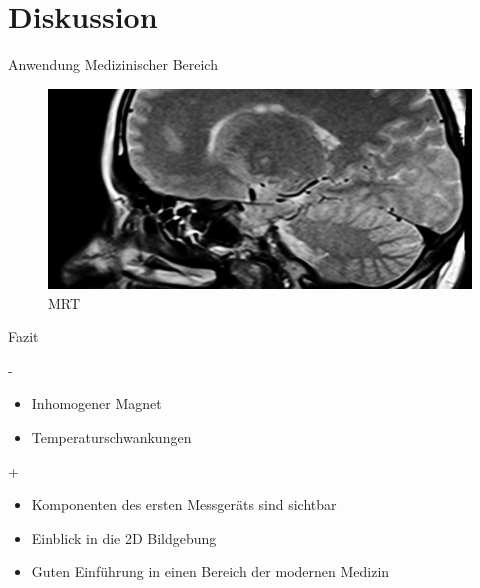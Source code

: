 \section{Diskussion}
\begin{frame}{Anwendung}
Medizinischer Bereich
	\begin{figure}
	\centering
	\includegraphics[scale=.35]{images//mrt.jpg}
	\caption{MRT}
	\end{figure}
\end{frame}

\begin{frame}{Fazit}
	\begin{alertblock}{-}
	\begin{itemize}
	\item Inhomogener Magnet
	\item Temperaturschwankungen
	\end{itemize}
	\end{alertblock}
	\begin{exampleblock}{+}
	\begin{itemize}
	\item Komponenten des ersten Messgeräts sind sichtbar
	\item Einblick in die 2D Bildgebung 
	\item Guten Einführung in einen Bereich der modernen Medizin
	\end{itemize}
	\end{exampleblock}
\end{frame}